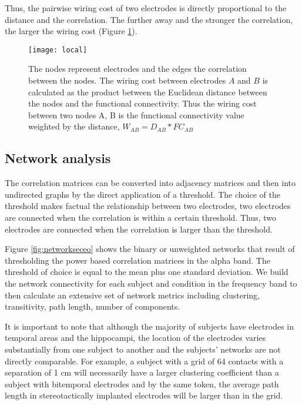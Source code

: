 \documentclass[11pt, onecolumn]{article}
\begin{document}
Thus, the pairwise wiring cost of two electrodes is directly proportional to the distance and the correlation. The further away and the stronger the correlation, the larger the wiring cost (Figure \ref{fig:wc}). 


\begin{figure}[H] 
\centering
    \texttt{[image: local]} 
    \caption{The nodes represent electrodes and the edges the correlation between the nodes. The wiring cost between electrodes $A$ and $B$ is calculated as the product between the Euclidean distance between the nodes and the functional connectivity. Thus the wiring cost between two nodes A, B is the functional connectivity value weighted by the distance, $W_{AB} = D_{AB} * FC_{AB}$} 
    \label{fig:wc} 
    \vspace{4ex}
  \end{figure}%

\subsection{Network analysis}
The correlation matrices can be converted into adjacency matrices and then into undirected graphs by the direct application of a threshold. The choice of the threshold makes factual the relationship between two electrodes, two electrodes are connected when the correlation is within a certain threshold. Thus, two electrodes are connected when the correlation is larger than the threshold.

Figure \ref{fig:networkseceo} shows the binary or unweighted networks that result of thresholding the power based correlation matrices in the alpha band. The threshold of choice is equal to the mean plus one standard deviation.  
We build the network connectivity for each subject and condition in the  frequency band to then calculate an extensive set of network metrics including clustering, transitivity, path length, number of components.


It is important to note that although the majority of subjects have electrodes in temporal areas and the hippocampi, the location of the electrodes varies substantially from one subject to another and the subjects’ networks are not directly comparable. For example, a subject with a grid of 64 contacts with a separation of 1 cm will necessarily have a larger clustering coefficient than a subject with bitemporal electrodes and by the same token, the average path length in stereotactically implanted electrodes will be larger than in the grid. 
\end{document}
